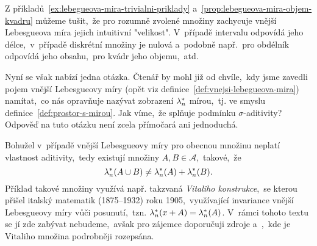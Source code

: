 Z příkladů~\ref{ex:lebegueova-mira-trivialni-priklady} a~\ref{prop:lebegueova-mira-objem-kvadru} můžeme tušit,~že pro rozumně zvolené množiny zachycuje vnější Lebesgueova míra jejich intuitivní "velikost". V~případě intervalu odpovídá jeho délce,~v~případě diskrétní množiny je nulová a~podobně např.~pro obdélník odpovídá jeho obsahu,~pro kvádr jeho objemu,~atd.

Nyní se však nabízí jedna otázka. Čtenář by mohl již od chvíle,~kdy jsme zavedli pojem vnější Lebesgueovy míry (opět viz definice~\ref{def:vnejsi-lebegueova-mira}) namítat,~co nás opravňuje nazývat zobrazení $\lambda_n^*$ mírou,~tj. ve smyslu definice~\ref{def:prostor-s-mirou}. Jak víme,~že splňuje podmínku $\sigma$-aditivity? Odpověď na tuto otázku není zcela přímočará ani jednoduchá.

Bohužel v~případě vnější Lebesgueovy míry pro obecnou množinu neplatí vlastnost aditivity,~tedy existují množiny $A,B\in\mathcal{A}$,~takové,~že
\[\lambda_n^*(A\cup B)\neq\lambda_n^*(A)+\lambda_n^*(B).\]
Příklad takové množiny využívá např. takzvaná \emph{Vitaliho konstrukce},~se kterou přišel italský matematik  (1875--1932) roku 1905,~využívající invariance vnější Lebesgueovy míry vůči posunutí,~tzn. $\lambda_n^*(x+A)=\lambda_n^*(A)$. \cite{OConnor2025} V~rámci tohoto textu se jí zde zabývat nebudeme,~avšak pro zájemce doporučuji zdroje \citep[str. 3]{Lukes2013} a~\cite{Verner2025},~kde je Vitaliho množina podrobněji rozepsána.

